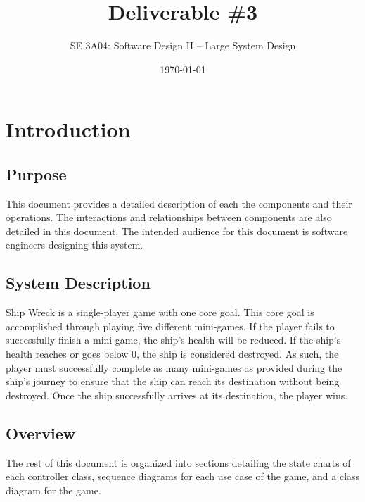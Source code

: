 \documentclass[]{article}
\title{Deliverable \#3}
\author{SE 3A04: Software Design II -- Large System Design}
\date{\today}
\begin{document}
\maketitle	

\section{Introduction}
\label{sec:introduction}
\subsection{Purpose}
\label{sub:purpose}
This document provides a detailed description of each the components and their operations. The interactions and relationships between components are also detailed in this document. The intended audience for this document is software engineers designing this system.

\subsection{System Description}
\label{sub:system_description}
Ship Wreck is a single-player game with one core goal. This core goal is accomplished through playing five different mini-games. If the player fails to successfully finish a mini-game, the ship's health will be reduced. If the ship's health reaches or goes below 0, the ship is considered destroyed. As such, the player must successfully complete as many mini-games as provided during the ship's journey to ensure that the ship can reach its destination without being destroyed. Once the ship successfully arrives at its destination, the player wins.

\subsection{Overview}
\label{sub:overview}
The rest of this document is organized into sections detailing the state charts of each controller class, sequence diagrams for each use case of the game, and a class diagram for the game.

\end{document}
